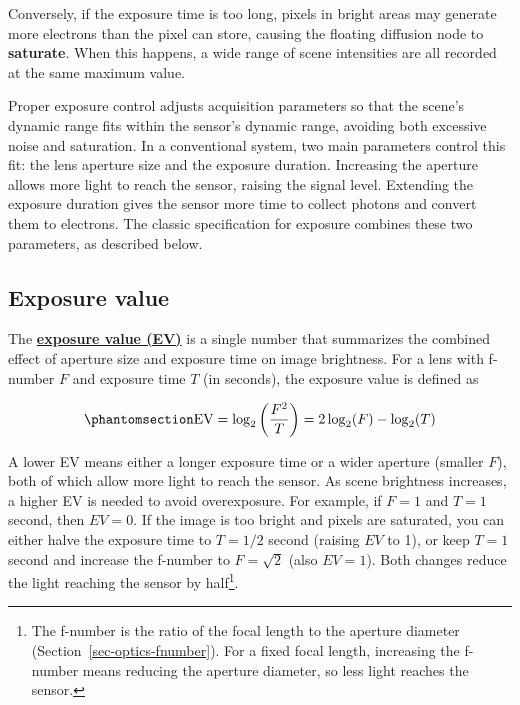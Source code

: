 \documentclass[
  letterpaper,
]{book}
\begin{document}
Conversely, if the exposure time is too long, pixels in bright areas may
generate more electrons than the pixel can store, causing the floating
diffusion node to \textbf{saturate}. When this happens, a wide range of
scene intensities are all recorded at the same maximum value.

Proper exposure control adjusts acquisition parameters so that the
scene's dynamic range fits within the sensor's dynamic range, avoiding
both excessive noise and saturation. In a conventional system, two main
parameters control this fit: the lens aperture size and the exposure
duration. Increasing the aperture allows more light to reach the sensor,
raising the signal level. Extending the exposure duration gives the
sensor more time to collect photons and convert them to electrons. The
classic specification for exposure combines these two parameters, as
described below.

\subsection{Exposure value}\label{sec-exposure-value}

The \href{https://en.wikipedia.org/wiki/Exposure_value}{\textbf{exposure
value (EV)}} is a single number that summarizes the combined effect of
aperture size and exposure time on image brightness. For a lens with
f-number \(F\) and exposure time \(T\) (in seconds), the exposure value
is defined as

\begin{equation}\phantomsection\label{eq-exposure-value}{
\text{EV} = \log_{2}\left(\frac{F^2}{T}\right) = 2 \log_{2}(F) - \log_{2}(T)
}\end{equation}

A lower EV means either a longer exposure time or a wider aperture
(smaller \(F\)), both of which allow more light to reach the sensor. As
scene brightness increases, a higher EV is needed to avoid overexposure.
For example, if \(F = 1\) and \(T = 1\) second, then \(EV = 0\). If the
image is too bright and pixels are saturated, you can either halve the
exposure time to \(T = 1/2\) second (raising \(EV\) to 1), or keep
\(T = 1\) second and increase the f-number to \(F = \sqrt{2}\) (also
\(EV = 1\)). Both changes reduce the light reaching the sensor by
half\footnote{The f-number is the ratio of the focal length to the
  aperture diameter (Section~\ref{sec-optics-fnumber}). For a fixed
  focal length, increasing the f-number means reducing the aperture
  diameter, so less light reaches the sensor.}.
\end{document}
